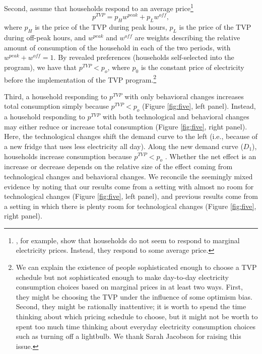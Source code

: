\documentclass[12pt]{article}
\begin{document}

Second, assume that households respond to an average price\footnote{ \citet{itoConsumersRespondMarginal2014}, for example, show that households do not seem to respond to marginal electricity prices. Instead, they respond to some average price.}
\begin{equation}
	p^{TVP} = p_{H} w^{peak} + p_{L} w^{off},
\end{equation}
where $p_{H}$ is the price of the TVP during peak hours, $p_{L}$ is the price of the TVP during off-peak hours, and $w^{peak}$ and $w^{off}$ are weights describing the relative amount of consumption of the household in each of the two periods, with $w^{peak} + w^{off} = 1$. By revealed preferences (households self-selected into the program), we have that $p^{TVP} < p_{o}$, where $p_{0}$ is the constant price of electricity before the implementation of the TVP program.\footnote{We can explain the existence of people sophisticated enough to choose a TVP schedule but not sophisticated enough to make day-to-day electricity consumption choices based on marginal prices in at least two ways. First, they might be choosing the TVP under the influence of some optimism bias. Second, they might be rationally inattentive; it is worth to spend the time thinking about which pricing schedule to choose, but it might not be worth to spent too much time thinking about everyday electricity consumption choices such as turning off a lightbulb. We thank Sarah Jacobson for raising this issue.}

Third, a household responding to $p^{TVP}$ with only behavioral changes increases total consumption simply because $p^{TVP} <p_{o}$ (Figure \ref{fig:five}, left panel). Instead, a household responding to $p^{TVP}$ with both technological and behavioral changes may either reduce or increase total consumption (Figure \ref{fig:five}, right panel). Here, the technological changes shift the demand curve to the left (i.e., because of a new fridge that uses less electricity all day). Along the new demand curve ($D_{1}$), households increase consumption because $p^{TVP} < p_{o}$ . Whether the net effect is an increase or decrease depends on the relative size of the effect coming from technological changes and behavioral changes. We reconcile the seemingly mixed evidence by noting that our results come from a setting with almost no room for technological changes (Figure \ref{fig:five}, left panel), and previous results come from a setting in which there is plenty room for technological changes (Figure \ref{fig:five}, right panel).
\end{document}
